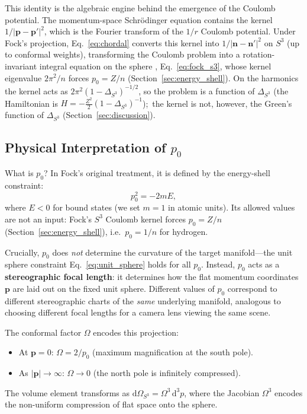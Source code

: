 \documentclass[aps,pra,twocolumn,superscriptaddress,longbibliography]{revtex4-2}
\begin{document}
This identity is the algebraic engine behind the emergence of the Coulomb potential. The momentum-space Schr\"odinger equation contains the kernel $1/|\mathbf{p} - \mathbf{p}'|^2$, which is the Fourier transform of the $1/r$ Coulomb potential. Under Fock's projection, Eq.~\eqref{eq:chordal} converts this kernel into $1/|\mathbf{n} - \mathbf{n}'|^2$ on $S^3$ (up to conformal weights), transforming the Coulomb problem into a rotation-invariant integral equation on the sphere \cite{fock1935}, Eq.~\eqref{eq:fock_s3}, whose kernel eigenvalue $2\pi^2/n$ forces $p_0 = Z/n$ (Section~\ref{sec:energy_shell}). On the harmonics the kernel acts as $2\pi^2(1-\Delta_{S^3})^{-1/2}$, so the problem is a function of $\Delta_{S^3}$ (the Hamiltonian is $H = -\tfrac{Z^2}{2}(1-\Delta_{S^3})^{-1}$);\ the kernel is not, however, the Green's function of $\Delta_{S^3}$ (Section~\ref{sec:discussion}).

\subsection{Physical Interpretation of $p_0$}

What is $p_0$? In Fock's original treatment, it is defined by the energy-shell constraint:
\begin{equation}
p_0^2 = -2m E,
\label{eq:energy_shell}
\end{equation}
where $E < 0$ for bound states (we set $m = 1$ in atomic units). Its allowed values are not an input: Fock's $S^3$ Coulomb kernel forces $p_0 = Z/n$ (Section~\ref{sec:energy_shell}), i.e.\ $p_0 = 1/n$ for hydrogen.

Crucially, $p_0$ does \textit{not} determine the curvature of the target manifold---the unit sphere constraint Eq.~\eqref{eq:unit_sphere} holds for all $p_0$. Instead, $p_0$ acts as a \textbf{stereographic focal length}: it determines how the flat momentum coordinates $\mathbf{p}$ are laid out on the fixed unit sphere. Different values of $p_0$ correspond to different stereographic charts of the \textit{same} underlying manifold, analogous to choosing different focal lengths for a camera lens viewing the same scene.

The conformal factor $\Omega$ encodes this projection:
\begin{itemize}
\item At $\mathbf{p} = 0$: $\Omega = 2/p_0$ (maximum magnification at the south pole).
\item As $|\mathbf{p}| \to \infty$: $\Omega \to 0$ (the north pole is infinitely compressed).
\end{itemize}
The volume element transforms as $\mathrm{d}\Omega_{S^3} = \Omega^3\, \mathrm{d}^3p$, where the Jacobian $\Omega^3$ encodes the non-uniform compression of flat space onto the sphere.
\end{document}
